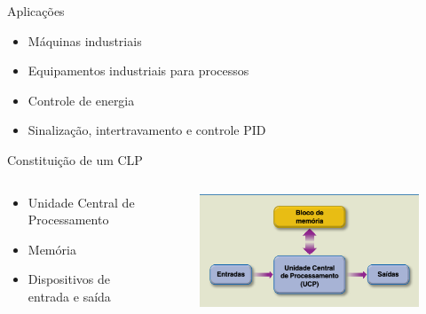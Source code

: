 \documentclass[aspectratio=169,
				xcolor=table]{beamer}
\begin{document}
	\begin{frame}{Aplicações}
		\begin{itemize}
			\item Máquinas industriais
			\vspace{1em}
			\item Equipamentos industriais para processos
			\vspace{1em}
			\item Controle de energia
			\vspace{1em}
			\item Sinalização, intertravamento e controle PID

		\end{itemize}
	\end{frame}

	\begin{frame}{Constituição de um CLP}
		\begin{columns}
			\begin{column}{0.5\textwidth}
				\begin{itemize}
					\item Unidade Central de Processamento
					\vspace{1em}
					\item Memória
					\vspace{1em}
					\item Dispositivos de entrada e saída
				\end{itemize}
			\end{column}
			\begin{column}{0.5\textwidth}
				\begin{figure}[hbtp]
				\centering
				\includegraphics[width=.9\textwidth, keepaspectratio]{../figs/cap04/constituicao.png}
				\end{figure}
		
			\end{column}
		\end{columns}
	\end{frame}
	
\end{document}
